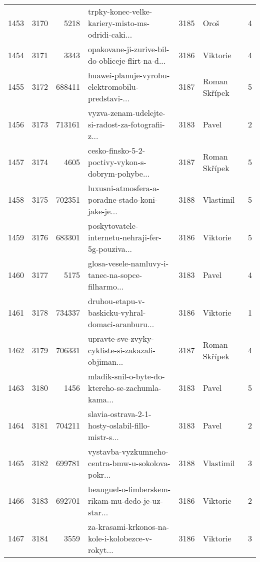\begin{tabular}{lrrlrlr}
1453 &       3170 &     5218 &  trpky-konec-velke-kariery-misto-ms-odridi-caki... &     3185 &                         Oroš &               4 \\
1454 &       3171 &     3343 &  opakovane-ji-zurive-bil-do-obliceje-flirt-na-d... &     3186 &                     Viktorie &               4 \\
1455 &       3172 &   688411 &  huawei-planuje-vyrobu-elektromobilu-predstavi-... &     3187 &                Roman Skřípek &               5 \\
1456 &       3173 &   713161 &  vyzva-zenam-udelejte-si-radost-za-fotografii-z... &     3183 &                        Pavel &               2 \\
1457 &       3174 &     4605 &  cesko-finsko-5-2-poctivy-vykon-s-dobrym-pohybe... &     3187 &                Roman Skřípek &               5 \\
1458 &       3175 &   702351 &  luxusni-atmosfera-a-poradne-stado-koni-jake-je... &     3188 &                    Vlastimil &               5 \\
1459 &       3176 &   683301 &  poskytovatele-internetu-nehraji-fer-5g-pouziva... &     3186 &                     Viktorie &               5 \\
1460 &       3177 &     5175 &  glosa-vesele-namluvy-i-tanec-na-sopce-filharmo... &     3183 &                        Pavel &               4 \\
1461 &       3178 &   734337 &  druhou-etapu-v-baskicku-vyhral-domaci-aranburu... &     3186 &                     Viktorie &               1 \\
1462 &       3179 &   706331 &  upravte-sve-zvyky-cykliste-si-zakazali-objiman... &     3187 &                Roman Skřípek &               4 \\
1463 &       3180 &     1456 &  mladik-snil-o-byte-do-ktereho-se-zachumla-kama... &     3183 &                        Pavel &               5 \\
1464 &       3181 &   704211 &  slavia-ostrava-2-1-hosty-oslabil-fillo-mistr-s... &     3183 &                        Pavel &               2 \\
1465 &       3182 &   699781 &  vystavba-vyzkumneho-centra-bmw-u-sokolova-pokr... &     3188 &                    Vlastimil &               3 \\
1466 &       3183 &   692701 &  beauguel-o-limberskem-rikam-mu-dedo-je-uz-star... &     3186 &                     Viktorie &               2 \\
1467 &       3184 &     3559 &  za-krasami-krkonos-na-kole-i-kolobezce-v-rokyt... &     3186 &                     Viktorie &               3 \\

\end{tabular}
